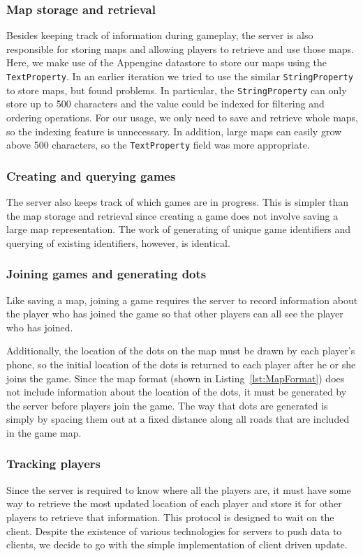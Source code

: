 \documentclass{acm_proc_article-sp}
\begin{document}
\subsubsection{Map storage and retrieval}
Besides keeping track of information during gameplay, the server
is also responsible for storing maps and allowing players to retrieve
and use those maps. Here, we make use of the Appengine
datastore to store our maps using the \texttt{TextProperty}.
In an earlier iteration we tried to use the similar \texttt{StringProperty}
to store maps, but found problems. In particular, the
\texttt{StringProperty} can only store up to
500 characters and the value could be indexed for filtering and
ordering operations. For our usage, we only need to save and retrieve whole
maps, so the indexing feature is unnecessary. In addition, large maps
can easily grow above 500 characters, so the \texttt{TextProperty} field
was more appropriate.


\subsubsection{Creating and querying games}
The server also keeps track of which games are in progress. This is simpler
than the map storage and retrieval since creating a game does not involve
saving a large map representation. The work of generating of unique game
identifiers and querying of existing identifiers, however, is identical.

\subsubsection{Joining games and generating dots}
Like saving a map, joining a game requires the server to record information
about the player who has joined the game so that other players can all
see the player who has joined.

Additionally, the location of the dots on the map must be drawn by each
player's phone, so the initial location of the dots is returned to each player
after he or she joins the game.  Since the map format (shown in
Listing~\ref{lst:MapFormat}) does not include information about the location of
the dots, it must be generated by the server before players join the game. The
way that dots are generated is simply by spacing them out at a fixed distance
along all roads that are included in the game map.

\subsubsection{Tracking players}
Since the server is required to know where all the players are, it
must have some way to retrieve the most updated location of each
player and store it for other players to retrieve that
information. This protocol is designed to wait on the client. Despite
the existence of various technologies for servers to push data to
clients, we decide to go with the simple implementation of client
driven update.
\end{document}
